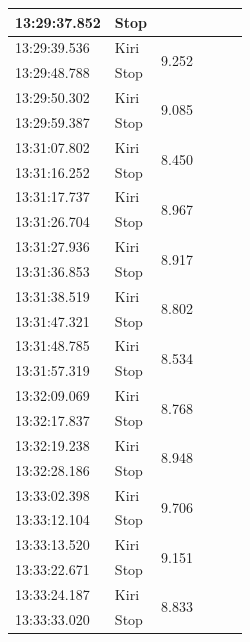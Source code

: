 \begin{longtable}{|l|l|l|l|l|l|}
  13:29:37.852 & Stop &                     \\ \hline
  13:29:39.536 & Kiri & \multirow{2}{*}{9.252}               \\   \cline{1-2}
  13:29:48.788 & Stop &                     \\ \hline
  13:29:50.302 & Kiri & \multirow{2}{*}{9.085}               \\   \cline{1-2}
  13:29:59.387 & Stop &                     \\ \hline
  13:31:07.802 & Kiri & \multirow{2}{*}{8.450}               \\   \cline{1-2}
  13:31:16.252 & Stop &                     \\ \hline
  13:31:17.737 & Kiri & \multirow{2}{*}{8.967}               \\   \cline{1-2}
  13:31:26.704 & Stop &                     \\ \hline
  13:31:27.936 & Kiri & \multirow{2}{*}{8.917}               \\   \cline{1-2}
  13:31:36.853 & Stop &                     \\ \hline
  13:31:38.519 & Kiri & \multirow{2}{*}{8.802}               \\   \cline{1-2}
  13:31:47.321 & Stop &                     \\ \hline
  13:31:48.785 & Kiri & \multirow{2}{*}{8.534}               \\   \cline{1-2}
  13:31:57.319 & Stop &                     \\ \hline
  13:32:09.069 & Kiri & \multirow{2}{*}{8.768}               \\   \cline{1-2}
  13:32:17.837 & Stop &                     \\ \hline
  13:32:19.238 & Kiri & \multirow{2}{*}{8.948}               \\   \cline{1-2}
  13:32:28.186 & Stop &                     \\ \hline
  13:33:02.398 & Kiri & \multirow{2}{*}{9.706}               \\   \cline{1-2}
  13:33:12.104 & Stop &                     \\ \hline
  13:33:13.520 & Kiri & \multirow{2}{*}{9.151}               \\   \cline{1-2}
  13:33:22.671 & Stop &                     \\ \hline
  13:33:24.187 & Kiri & \multirow{2}{*}{8.833}               \\   \cline{1-2}
  13:33:33.020 & Stop &                     \\ \hline

\end{longtable}
